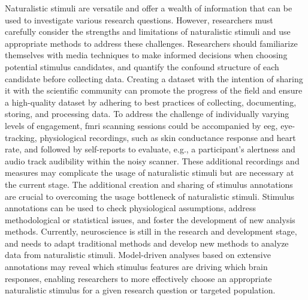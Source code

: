 %
Naturalistic stimuli are versatile and offer a wealth of information that can be
used to investigate various research questions.
%
However, researchers must carefully consider the strengths and limitations of
naturalistic stimuli and use appropriate methods to address these challenges.
%
Researchers should familiarize themselves with media techniques to make informed
decisions when choosing potential stimulus candidates, and quantify the confound
structure of each candidate before collecting data.
Creating a dataset with the intention of sharing it with the scientific
community can promote the progress of the field and ensure a high-quality
dataset by adhering to best practices of collecting, documenting, storing, and
processing data.
%
To address the challenge of individually varying levels of engagement, \ac{fmri}
scanning sessions could be accompanied by \ac{eeg}, eye-tracking, physiological
recordings, such as skin conductance response and heart rate, and followed by
self-reports to evaluate, e.g., a participant's alertness and audio track
audibility within the noisy scanner.
%
These additional recordings and measures may complicate the usage of
naturalistic stimuli but are necessary at the current stage.
The additional creation and sharing of stimulus annotations are crucial to
overcoming the usage bottleneck of naturalistic stimuli.
%
Stimulus annotations can be used to check physiological assumptions, address
methodological or statistical issues, and foster the development of new analysis
methods.
%
Currently, neuroscience is still in the research and development stage, and
needs to adapt traditional methods and develop new methods to analyze data from
naturalistic stimuli.
%
Model-driven analyses based on extensive annotations may reveal which stimulus
features are driving which brain responses, enabling researchers to more
effectively choose an appropriate naturalistic stimulus for a given research
question or targeted population.


